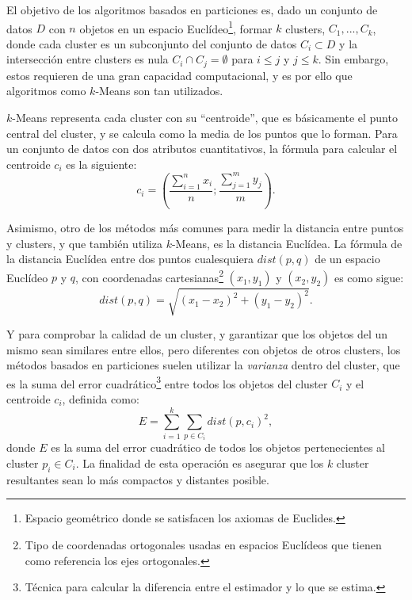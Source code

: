 \documentclass[3p,twocolumn]{elsarticle}
\begin{document}
El objetivo de los algoritmos basados en particiones es, dado un conjunto de datos $D$ con $n$ objetos en un espacio Euclídeo\footnote{Espacio geométrico donde se satisfacen los axiomas de Euclides.}, formar $k$ clusters, $C_{1}, ..., C_{k}$, donde cada cluster es un subconjunto del conjunto de datos $C_{i} \subset D$ y la intersección entre clusters es nula $C_{i} \cap C_{j} = \emptyset$ para $i \leq j$ y $j \leq k$. Sin embargo, estos requieren de una gran capacidad computacional, y es por ello que algoritmos como $k$-Means son tan utilizados.

$k$-Means representa cada cluster con su ``centroide'', que es básicamente el punto central del cluster, y se calcula como la media de los puntos que lo forman. Para un conjunto de datos con dos atributos cuantitativos, la fórmula para calcular el centroide $c_{i}$ es la siguiente: \begin{equation} c_{i} = \left( \frac{\sum _{i=1}^n x_{i}}{n}; \frac{\sum _{j=1}^m y_{j}}{m} \right). \end{equation} 

Asimismo, otro de los métodos más comunes para medir la distancia entre puntos y clusters, y que también utiliza $k$-Means, es la distancia Euclídea. La fórmula de la distancia Euclídea entre dos puntos cualesquiera $dist(p, q)$ de un espacio Euclídeo $p$ y $q$, con coordenadas cartesianas\footnote{Tipo de coordenadas ortogonales usadas en espacios Euclídeos que tienen como referencia los ejes ortogonales.} $(x_{1}, y_{1})$ y $(x_{2}, y_{2})$ es como sigue: \begin{equation}  dist\left( p,q\right) =  \sqrt{ \left(x_1-x_2 \right)^2 + \left(y_1 - y_2 \right)^2}. \end{equation} 

Y para comprobar la calidad de un cluster, y garantizar que los objetos del un mismo sean similares entre ellos, pero diferentes con objetos de otros clusters, los métodos basados en particiones suelen utilizar la \textit{varianza} dentro del cluster, que es la suma del error cuadrático\footnote{Técnica para calcular la diferencia entre el estimador y lo que se estima.} entre todos los objetos del cluster $C_i$ y el centroide $c_i$, definida como: \begin{equation} E =  \sum_{i=1}^{k}  \sum_{p \in C_i} dist(p, c_i)^2 , \end{equation} donde $E$ es la suma del error cuadrático de todos los objetos pertenecientes al cluster $p_i \in C_i$. La finalidad de esta operación es asegurar que los $k$ cluster resultantes sean lo más compactos y distantes posible.
\end{document}

